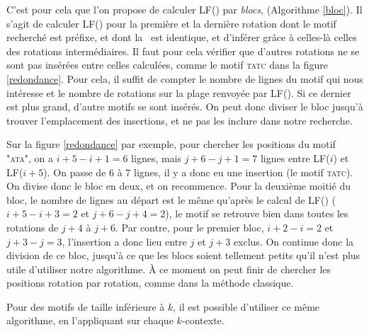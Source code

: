 C'est pour cela que l'on propose de calculer LF() par \textit{blocs}, (Algorithme \ref{bloc}). Il s'agit de calculer LF() pour la première et la dernière rotation dont le motif recherché est préfixe, et dont la \kbwt\ est identique, et d'inférer grâce à celles-là celles des rotations intermédiaires. Il faut pour cela vérifier que d'autres rotations ne se sont pas insérées entre celles calculées, comme le motif \textsc{tatc} dans la figure \ref{redondance}. Pour cela, il suffit de compter le nombre de lignes du motif qui nous intéresse et le nombre de rotations sur la plage renvoyée par LF(). Si ce dernier est plus grand, d'autre motifs se sont insérés. On peut donc diviser le bloc jusqu'à trouver l'emplacement des insertions, et ne pas les inclure dans notre recherche.

Sur la figure \ref{redondance} par exemple, pour chercher les positions du motif \textsc{"ata"}, on a $i+5 - i +1 = 6$ lignes, mais $j+6 - j +1 = 7$ lignes entre LF($i$) et LF($i+5$). On passe de 6 à 7 lignes, il y a donc eu une insertion (le motif \textsc{tatc}). On divise donc le bloc en deux, et on recommence. Pour la deuxième moitié du bloc, le nombre de lignes au départ est le même qu'après le calcul de LF() ($i+5 - i+3 = 2$ et $j+6 - j+4 = 2$), le motif se retrouve bien dans toutes les rotations de $j+4$ à $j+6$. Par contre, pour le premier bloc, $i+2 - i = 2$ et $j+3 - j = 3$, l'insertion a donc lieu entre $j$ et $j+3$ exclus. On continue donc la division de ce bloc, jusqu'à ce que les blocs soient tellement petits qu'il n'est plus utile d'utiliser notre algorithme. À ce moment on peut finir de chercher les positions rotation par rotation, comme dans la méthode classique.

Pour des motifs de taille inférieure à $k$, il est possible d'utiliser ce même algorithme, en l'appliquant sur chaque $k$-contexte.

